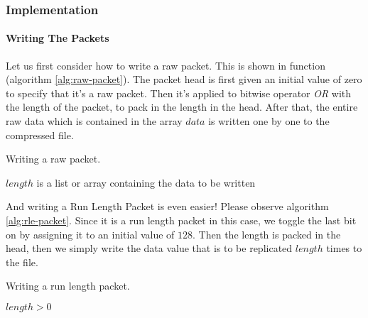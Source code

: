 \begin{refsection}
\subsubsection{Implementation}
\label{sec:packbits-implementation}

\paragraph{Writing The Packets}
\label{sec:writing-packets}

Let us first consider how to write a raw packet. This is shown in
function (algorithm
\ref{alg:raw-packet}). The packet head is first given an initial value
of zero to specify that it's a raw packet. Then it's applied to
bitwise operator \textit{OR} with the length of the packet, to pack in
the length in the head. After that, the entire raw data which is
contained in the array $data$ is written one by one to the compressed file.

\begin{algorithm}
  \caption{Writing a raw packet.}
  \label{alg:raw-packet}
  \begin{algorithmic}[1]
    \Require $length$ is a list or array containing the data to be written
      \State {}
        \State {}
      \EndForEach
    \EndFunction
  \end{algorithmic}
\end{algorithm}

And writing a Run Length Packet is even easier! Please observe
algorithm \ref{alg:rle-packet}. Since it is a run length packet in
this case, we toggle the last bit on by assigning it to an initial
value of $128$. Then the length is packed in the head, then we simply
write the data value that is to be replicated $length$ times to the
file.

\begin{algorithm}
  \caption{Writing a run length packet.}
  \label{alg:rle-packet}
  \begin{algorithmic}[1]
    \Require $length > 0$
      \State {}
      \State {}
    \EndFunction
  \end{algorithmic}
\end{algorithm}


\end{refsection}
